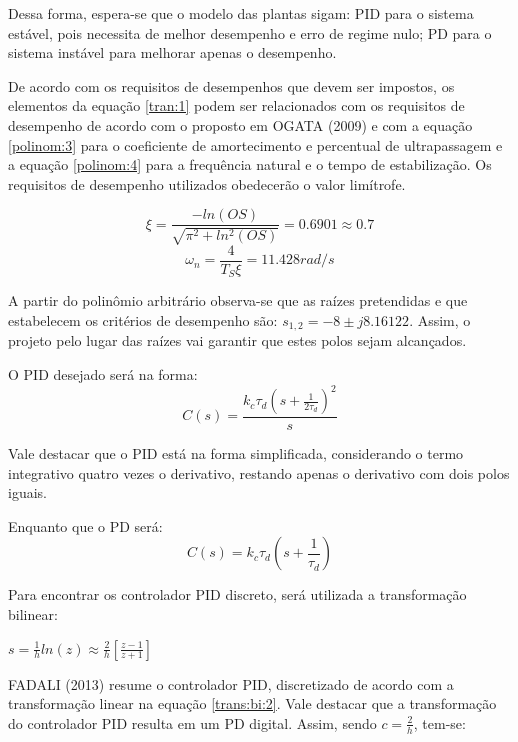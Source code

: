 Dessa forma, espera-se que o modelo das plantas sigam: PID para o sistema estável, pois necessita de melhor desempenho e erro de regime nulo; PD para o sistema instável para melhorar apenas o desempenho.

De acordo com os requisitos de desempenhos que devem ser impostos, os elementos da equação \ref{tran:1} podem ser relacionados com os requisitos de desempenho de acordo com o proposto em OGATA (2009) e com a equação \ref{polinom:3} para o coeficiente de amortecimento e percentual de ultrapassagem e a equação \ref{polinom:4} para a frequência natural e o tempo de estabilização. Os requisitos de desempenho utilizados obedecerão o valor limítrofe. 

\begin{equation} \label{polinom:3}
    \xi = \frac{-ln(OS)}{\sqrt{\pi^2+ln^2(OS)}} = 0.6901 \approx 0.7
\end{equation}
\begin{equation} \label{polinom:4}
    \omega_n = \frac{4}{T_S\xi} = 11.428 rad/s
\end{equation}

A partir do polinômio arbitrário observa-se que as raízes pretendidas e que estabelecem os critérios de desempenho são: $s_{1,2} = -8 \pm j8.16122$. Assim, o projeto pelo lugar das raízes vai garantir que estes polos sejam alcançados.

O PID desejado será na forma:
\begin{equation} \label{pid:0}
    C(s) = \frac{k_c\tau_d\left(s+\frac{1}{2\tau_d}\right)^2}{s}
\end{equation}

Vale destacar que o PID está na forma simplificada, considerando o termo integrativo quatro vezes o derivativo, restando apenas o derivativo com dois polos iguais.

Enquanto que o PD será:
\begin{equation} \label{pid:1}
    C(s) = k_c\tau_d\left(s+ \frac{1}{\tau_d}\right)
\end{equation}

Para encontrar os controlador PID discreto, será utilizada a transformação bilinear:

\begin{center}
    $s = \frac{1}{h}ln(z) \approx \frac{2}{h}\left[\frac{z-1}{z+1}\right]$\vspace{4pt}\\
\end{center}

FADALI (2013) resume o controlador PID, discretizado de acordo com a transformação linear na equação \ref{trans:bi:2}. Vale destacar que a transformação do controlador PID resulta em um PD digital. Assim, sendo $c=\frac{2}{h}$, tem-se:


